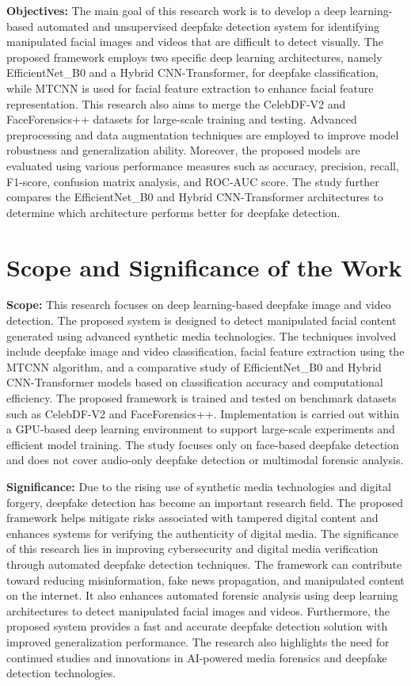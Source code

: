 \documentclass[12pt,a4paper]{report}
\begin{document}
\textbf{Objectives:} The main goal of this research work is to develop a deep learning-based automated and unsupervised deepfake detection system for identifying manipulated facial images and videos that are difficult to detect visually. The proposed framework employs two specific deep learning architectures, namely EfficientNet\_B0 and a Hybrid CNN-Transformer, for deepfake classification, while MTCNN is used for facial feature extraction to enhance facial feature representation. This research also aims to merge the CelebDF-V2 and FaceForensics++ datasets for large-scale training and testing. Advanced preprocessing and data augmentation techniques are employed to improve model robustness and generalization ability. Moreover, the proposed models are evaluated using various performance measures such as accuracy, precision, recall, F1-score, confusion matrix analysis, and ROC-AUC score. The study further compares the EfficientNet\_B0 and Hybrid CNN-Transformer architectures to determine which architecture performs better for deepfake detection.
\section{Scope and Significance of the Work}
\textbf{Scope:} This research focuses on deep learning-based deepfake image and video detection. The proposed system is designed to detect manipulated facial content generated using advanced synthetic media technologies. The techniques involved include deepfake image and video classification, facial feature extraction using the MTCNN algorithm, and a comparative study of EfficientNet\_B0 and Hybrid CNN-Transformer models based on classification accuracy and computational efficiency. The proposed framework is trained and tested on benchmark datasets such as CelebDF-V2 and FaceForensics++. Implementation is carried out within a GPU-based deep learning environment to support large-scale experiments and efficient model training. The study focuses only on face-based deepfake detection and does not cover audio-only deepfake detection or multimodal forensic analysis.

\textbf{Significance:} Due to the rising use of synthetic media technologies and digital forgery, deepfake detection has become an important research field. The proposed framework helps mitigate risks associated with tampered digital content and enhances systems for verifying the authenticity of digital media. The significance of this research lies in improving cybersecurity and digital media verification through automated deepfake detection techniques. The framework can contribute toward reducing misinformation, fake news propagation, and manipulated content on the internet. It also enhances automated forensic analysis using deep learning architectures to detect manipulated facial images and videos. Furthermore, the proposed system provides a fast and accurate deepfake detection solution with improved generalization performance. The research also highlights the need for continued studies and innovations in AI-powered media forensics and deepfake detection technologies.
\end{document}
